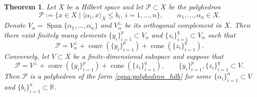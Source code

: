 \documentclass{article}
\numberwithin{equation}{section}
\newtheorem{theorem}{Theorem}[section]
\begin{document}
\begin{theorem}\label{Theo:decomp_hilbert}
Let $X$ be a Hilbert space and let $\mathcal{P}\subset X$ be the polyhedron
\begin{equation}\label{equa:polyhedron_hilb}
    \mathcal{P}
    :=
    \{x\in X \mid \langle \alpha_i,x\rangle_X\le b_i,\ i=1,\dots,n\},
    \qquad \alpha_1,\dots,\alpha_n\in X.
\end{equation}
Denote $V_\alpha=\operatorname{Span}\{\alpha_1,...,\alpha_n\}$ and $V_\alpha^\bot$ be its orthogonal complement in $X$. Then there exist finitely many elements $\{y_i\}_{i=1}^p\subset V_\alpha$ and  $\{z_i\}_{i=1}^q\subset V_\alpha$ such that
\begin{equation}\label{equa:MW_theorem_inf}
    \mathcal{P}
    =
    V_\alpha^\perp
    +
    \operatorname{conv}(\{y_i\}_{i=1}^p)
    +
    \operatorname{cone}(\{z_i\}_{i=1}^q).
\end{equation}
Conversely, let $V\subset X$ be a finite-dimensional subspace and suppose that
\begin{equation}\label{mh:1}
\mathcal{P}
=
V^\perp
+
\operatorname{conv}(\{y_i\}_{i=1}^p)
+
\operatorname{cone}(\{z_i\}_{i=1}^q),
\qquad
\{y_i\}_{i=1}^p,\{z_i\}_{i=1}^q\subset V.
\end{equation}
Then $\mathcal{P}$ is a polyhedron of the form \eqref{equa:polyhedron_hilb} for some $\{\alpha_i\}_{i=1}^n\subset V$ and $\{b_i\}_{i=1}^n\subset \mathbb{R}$.
\end{theorem}
\end{document}
